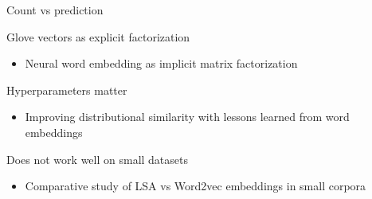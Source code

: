 \documentclass[xcolor={table}]{beamer}
\begin{document}
\begin{frame}{Count vs prediction}
    \begin{block}{Glove vectors as explicit factorization}
        \begin{itemize}
            \item Neural word embedding as implicit matrix factorization \cite{levy2014neural}
        \end{itemize}
    \end{block}

    \begin{block}{Hyperparameters matter}
        \begin{itemize}
            \item Improving distributional similarity with lessons learned from word embeddings \cite{levy2015improving}
        \end{itemize}
    \end{block}

    \begin{block}{Does not work well on small datasets}
        \begin{itemize}
            \item Comparative study of LSA vs Word2vec embeddings in small corpora \cite{altszyler2016comparative}
        \end{itemize}
    \end{block}
\end{frame} 



\end{document}
